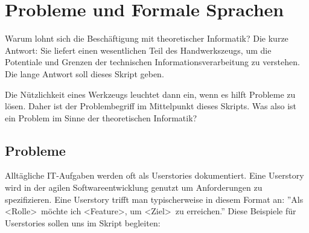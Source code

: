 \chapter{Probleme und Formale Sprachen}\label{einleitung}
Warum lohnt sich die Beschäftigung mit theoretischer Informatik?
Die kurze Antwort: Sie liefert einen wesentlichen Teil des Handwerkszeugs,
um die Potentiale und Grenzen der technischen Informationsverarbeitung zu verstehen.
Die lange Antwort soll dieses Skript geben.

Die Nützlichkeit eines Werkzeugs leuchtet dann ein,
wenn es hilft Probleme zu lösen.
Daher ist der Problembegriff im Mittelpunkt dieses Skripts.
Was also ist ein Problem im Sinne der theoretischen Informatik?

\section{Probleme}

Alltägliche IT-Aufgaben werden oft als Userstories dokumentiert.
Eine Userstory wird in der agilen Softwareentwicklung genutzt um Anforderungen zu spezifizieren.
Eine Userstory trifft man typischerweise in diesem Format an:
''Als \textless Rolle\textgreater\ möchte ich \textless Feature\textgreater,
um \textless Ziel\textgreater\ zu erreichen.''
Diese Beispiele für Userstories sollen uns im Skript begleiten:

